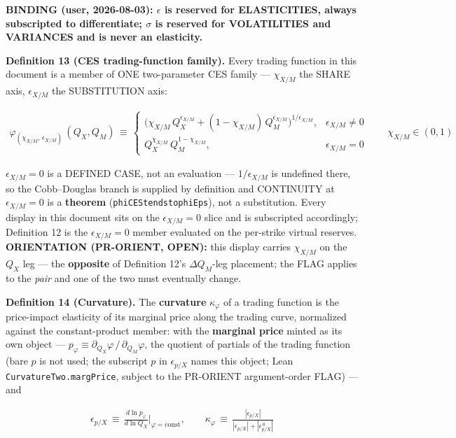 \documentclass[11pt]{article}
\renewcommand{\_}{\textunderscore\allowbreak}
\begin{document}
\textbf{BINDING (user, 2026-08-03): \(\epsilon\) is reserved for ELASTICITIES, always subscripted to differentiate; \(\sigma\) is reserved for VOLATILITIES and VARIANCES and is never an elasticity.}

\textbf{Definition 13 (CES trading-function family).} Every trading function in this document is a member of ONE two-parameter CES family --- \(\chi_{X/M}\) the SHARE axis, \(\epsilon_{X/M}\) the SUBSTITUTION axis:

\[
    \begin{aligned}
        \varphi_{(\chi_{X/M},\,\epsilon_{X/M})}\,(Q_X,Q_M) \, \equiv \,
        \begin{cases}
            \big(\chi_{X/M}\,Q_X^{\epsilon_{X/M}} + (1-\chi_{X/M})\,Q_M^{\epsilon_{X/M}}\big)^{1/\epsilon_{X/M}}, & \epsilon_{X/M} \neq 0 \\[4pt]
            Q_X^{\chi_{X/M}}\,Q_M^{1-\chi_{X/M}}, & \epsilon_{X/M} = 0
        \end{cases}
        \qquad \chi_{X/M} \in (0,1)
    \end{aligned}
\]

\(\epsilon_{X/M} = 0\) is a DEFINED CASE, not an evaluation --- \(1/\epsilon_{X/M}\) is undefined there, so the Cobb--Douglas branch is supplied by definition and CONTINUITY at \(\epsilon_{X/M} = 0\) is a \textbf{theorem} (\texttt{phiCES\_tendsto\_phiEps}), not a substitution. Every display in this document sits on the \(\epsilon_{X/M} = 0\) slice and is subscripted accordingly; Definition 12 is the \(\epsilon_{X/M} = 0\) member evaluated on the per-strike virtual reserves. \textbf{ORIENTATION (PR-ORIENT, OPEN):} this display carries \(\chi_{X/M}\) on the \(Q_X\) leg --- the \textbf{opposite} of Definition 12's \(\Delta Q_M\)-leg placement; the FLAG applies to the \emph{pair} and one of the two must eventually change.

\textbf{Definition 14 (Curvature).} The \textbf{curvature} \(\kappa_{\varphi}\) of a trading function is the price-impact elasticity of its marginal price along the trading curve, normalized against the constant-product member: with the \textbf{marginal price} minted as its own object --- \(p_{\varphi} \equiv \partial_{Q_X}\varphi \,/\, \partial_{Q_M}\varphi\), the quotient of partials of the trading function (bare \(p\) is not used; the subscript \(p\) in \(\epsilon_{p/X}\) names this object; Lean \texttt{CurvatureTwo.margPrice}, subject to the PR-ORIENT argument-order FLAG) --- and

\[
    \begin{aligned}
        \epsilon_{p/X} \, \equiv \, \frac{d \ln p_{\varphi}}{d \ln Q_X}\Big|_{\varphi = \text{const}}, \qquad
        \kappa_{\varphi} \, \equiv \, \frac{|\epsilon_{p/X}|}{|\epsilon_{p/X}| + |\epsilon_{p/X}^{\,0}|}
    \end{aligned}
\]
\end{document}
